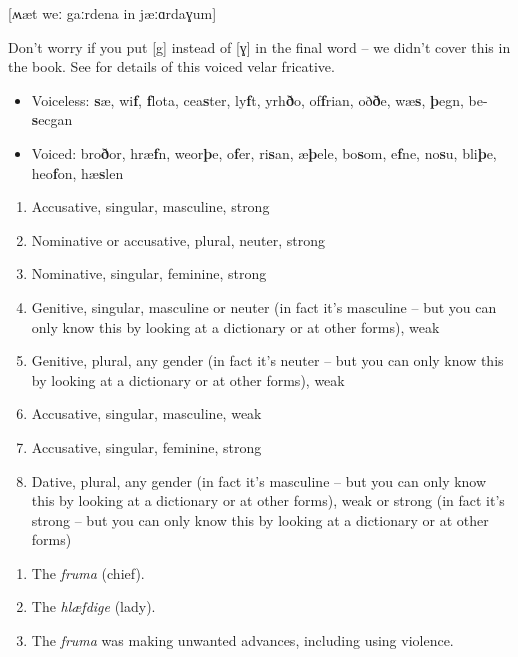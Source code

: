 \noindent\textbf{}

[ʍæt weː gaːrdena in jæːɑrdaɣum]

\noindent Don't worry if you put [g] instead of [ɣ] in the final word -- we didn't cover this in the book. See \citet[91]{Hogg1992} for details of this voiced velar fricative.\\

\noindent\textbf{}

\begin{itemize}
    \item Voiceless: \textbf{s}æ, wi\textbf{f}, \textbf{f}lota, cea\textbf{s}ter, ly\textbf{f}t, yrh\textbf{ð}o, of\textbf{f}rian, oð\textbf{ð}e, wæ\textbf{s}, \textbf{þ}egn, be-\textbf{s}ecgan
    \item Voiced: bro\textbf{ð}or, hræ\textbf{f}n, weor\textbf{þ}e, o\textbf{f}er, ri\textbf{s}an, æ\textbf{þ}ele, bo\textbf{s}om, e\textbf{f}ne, no\textbf{s}u, bli\textbf{þ}e, heo\textbf{f}on, hæ\textbf{s}len
\end{itemize}

\noindent\textbf{}
\begin{enumerate}
    \item Accusative, singular, masculine, strong
    \item Nominative or accusative, plural, neuter, strong
    \item Nominative, singular, feminine, strong
    \item Genitive, singular, masculine or neuter (in fact it's masculine -- but you can only know this by looking at a dictionary or at other forms), weak
    \item Genitive, plural, any gender (in fact it's neuter -- but you can only know this by looking at a dictionary or at other forms), weak
    \item Accusative, singular, masculine, weak
    \item Accusative, singular, feminine, strong
    \item Dative, plural, any gender (in fact it's masculine -- but you can only know this by looking at a dictionary or at other forms), weak or strong (in fact it's strong -- but you can only know this by looking at a dictionary or at other forms)
\end{enumerate}

\noindent\textbf{}
\begin{enumerate}
    \item The \emph{fruma} (chief).
    \item The \emph{hlæfdige} (lady).
    \item The \emph{fruma} was making unwanted advances, including using violence.
\end{enumerate}

